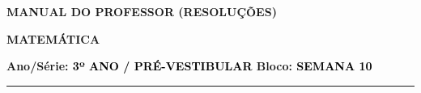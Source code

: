 \documentclass[11pt, a4paper]{article}
\begin{document}
\noindent
\begin{minipage}[t]{0.12\linewidth}
    \vspace{0pt}
\end{minipage}
\hfill
\begin{minipage}[t]{0.85\linewidth}
    \vspace{0pt}
    \begin{tcolorbox}[colback=white, colframe=gray!50, arc=4pt, sharp corners=southwest, boxrule=0.8pt, left=10pt, right=10pt, top=6pt, bottom=6pt]
        \begin{minipage}[c]{0.65\linewidth}
            \Large\bfseries MANUAL DO PROFESSOR (RESOLUÇÕES)
        \end{minipage}
        \hfill
        \begin{minipage}[c]{0.33\linewidth}
            \raggedleft\small\bfseries\textcolor{gray!70!black}{\MakeUppercase{MATEMÁTICA}}
        \end{minipage}
    \end{tcolorbox}
    \vspace{0.15cm} 
    \begin{tcolorbox}[colback=white, colframe=gray!50, arc=4pt, sharp corners=northwest, boxrule=0.8pt, left=10pt, right=10pt, top=2pt, bottom=2pt]
        \small\bfseries\textcolor{gray!85}{Ano/Série:} \textcolor{black}{3º ANO / PRÉ-VESTIBULAR} \hspace{2.5cm} \textcolor{gray!85}{Bloco:} \textcolor{black}{SEMANA 10}
    \end{tcolorbox}
\end{minipage}

\vspace{0.7cm}
\noindent\rule{\linewidth}{1.2pt} 
\vspace{0.4cm}
\end{document}
